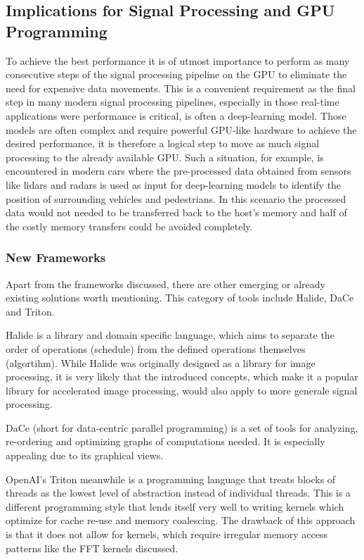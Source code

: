 \documentclass[english,11pt,a4paper,table]{article} %
\begin{document}
\subsection{Implications for Signal Processing and GPU Programming}
To achieve the best performance it is of utmost importance to perform as many consecutive steps of the signal processing pipeline on the GPU to eliminate the need for expensive data movements.
This is a convenient requirement as the final step in many modern signal processing pipelines, especially in those real-time applications were performance is critical, is often a deep-learning model.
Those models are often complex and require powerful GPU-like hardware to achieve the desired performance, it is therefore a logical step to move as much signal processing to the already available GPU.
Such a situation, for example, is encountered in modern cars where the pre-processed data obtained from sensors like lidars and radars is used as input for deep-learning models to identify the position of surrounding vehicles and pedestrians.
In this scenario the processed data would not needed to be transferred back to the host's memory and half of the costly memory transfers could be avoided completely.

\subsubsection{New Frameworks}
Apart from the frameworks discussed, there are other emerging or already existing solutions worth mentioning.
This category of tools include Halide, DaCe and Triton.

Halide \cite{Halide} is a library and domain specific language, which aims to separate the order of operations (schedule) from the defined operations themselves (algortihm).
While Halide was originally designed as a library for image processing, it is very likely that the introduced concepts, which make it a popular library for accelerated image processing, would also apply to more generale signal processing.

DaCe \cite{dace} (short for data-centric parallel programming) is a set of tools for analyzing, re-ordering and optimizing graphs of computations needed.
It is especially appealing due to its graphical views.  

OpenAI's Triton \cite{triton} meanwhile is a programming language that treats blocks of threads as the lowest level of abstraction instead of individual threads.
This is a different programming style that lends itself very well to writing kernels which optimize for cache re-use and memory coalescing.
The drawback of this approach is that it does not allow for kernels, which require irregular memory access patterns like the FFT kernels discussed.
\end{document}
